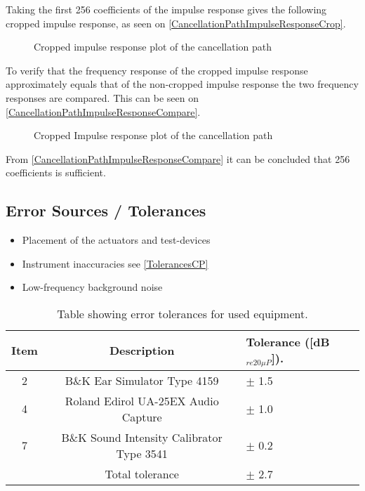 Taking the first 256 coefficients of the impulse response gives the following cropped impulse response, as seen on \autoref{CancellationPathImpulseResponseCrop}.

\begin{figure}[H]
	\centering
	
	\caption{Cropped impulse response plot of the cancellation path}
	\label{CancellationPathImpulseResponseCrop}
\end{figure}
To verify that the frequency response of the cropped impulse response approximately equals that of the non-cropped impulse response the two frequency responses are compared. This can be seen on \autoref{CancellationPathImpulseResponseCompare}.

\begin{figure}[H]
	\centering
	
	\caption{Cropped Impulse response plot of the cancellation path}
	\label{CancellationPathImpulseResponseCompare}
\end{figure}

From \autoref{CancellationPathImpulseResponseCompare} it can be concluded that 256 coefficients is sufficient. 

\subsection{Error Sources / Tolerances}
\begin{itemize}
	\item Placement of the actuators and test-devices
	\item Instrument inaccuracies see \autoref{TolerancesCP}
	\item Low-frequency background noise
\end{itemize}

\begin{table}[h]
	\centering
	\begin{tabular}{ c c l } \toprule
		{Item}	& 		{Description} 	& {Tolerance ([dB$_{re20\mu P}$])}.	 \\ \bottomrule 
		2	&	B\&K Ear Simulator Type 4159				& $\pm$ 1.5 	\\
		4	&	Roland Edirol UA-25EX Audio Capture			& $\pm$ 1.0	\\
		7	&	B\&K Sound Intensity Calibrator Type 3541	& $\pm$ 0.2	\\ \bottomrule
			&	Total tolerance								& $\pm$ 2.7	\\ \bottomrule	
	\end{tabular}
	\caption{Table showing error tolerances for used equipment.}
	\label{TolerancesCP}
\end{table}

